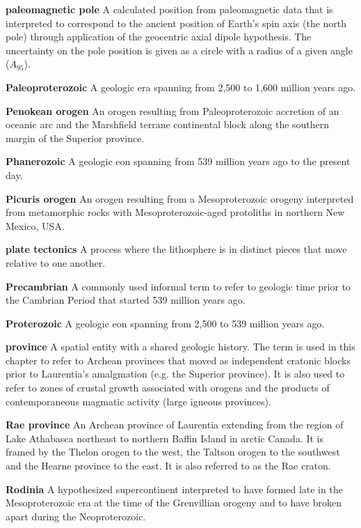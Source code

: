 \documentclass[twocolumn, switch]{article} %
\begin{document}
\noindent\textbf{paleomagnetic pole } A calculated position from paleomagnetic data that is interpreted to correspond to the ancient position of Earth's spin axis (the north pole) through application of the geocentric axial dipole hypothesis. The uncertainty on the pole position is given as a circle with a radius of a given angle ($A_{95}$).

\noindent\textbf{Paleoproterozoic } A geologic era spanning from 2,500 to 1,600 million years ago.

\noindent\textbf{Penokean orogen } An orogen resulting from Paleoproterozoic accretion of an oceanic arc and the Marshfield terrane continental block along the southern margin of the Superior province.

\noindent\textbf{Phanerozoic } A geologic eon spanning from 539 million years ago to the present day.

\noindent\textbf{Picuris orogen } An orogen resulting from a Mesoproterozoic orogeny interpreted from metamorphic rocks with Mesoproterozoic-aged protoliths in northern New Mexico, USA.

\noindent\textbf{plate tectonics } A process where the lithosphere is in distinct pieces that move relative to one another. 

\noindent\textbf{Precambrian } A commonly used informal term to refer to geologic time prior to the Cambrian Period that started 539 million years ago.

\noindent\textbf{Proterozoic } A geologic eon spanning from 2,500 to 539 million years ago.

\noindent\textbf{province } A spatial entity with a shared geologic history. The term is used in this chapter to refer to Archean provinces that moved as independent cratonic blocks prior to Laurentia's amalgmation (e.g. the Superior province). It is also used to refer to zones of crustal growth associated with orogens and the products of contemporaneous magmatic activity (large igneous provinces).

\noindent\textbf{Rae province } An Archean province of Laurentia extending from the region of Lake Athabasca northeast to northern Baffin Island in arctic Canada. It is framed by the Thelon orogen to the west, the Taltson orogen to the southwest and the Hearne province to the east. It is also referred to as the Rae craton.

\noindent\textbf{Rodinia } A hypothesized supercontinent interpreted to have formed late in the Mesoproterozoic era at the time of the Grenvillian orogeny and to have broken apart during the Neoproterozoic.
\end{document}
